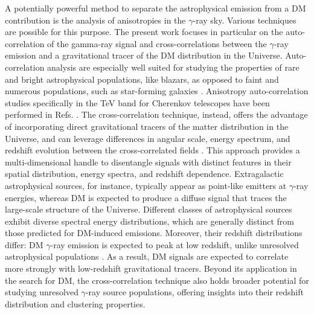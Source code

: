 A potentially powerful method to separate the astrophysical emission from a DM contribution is the analysis of anisotropies in the $\gamma$-ray sky.
Various techniques are possible for this purpose. 
The present work focuses in particular on the auto-correlation of the gamma-ray signal and 
cross-correlations between the $\gamma$-ray emission and a gravitational tracer of the DM distribution in the Universe.
Auto-correlation analysis are especially well suited for studying the properties of rare and bright astrophysical populations, like blazars, as opposed to faint and numerous populations, such as star-forming galaxies \cite{Ando:2006mt,Ando:2013ff,Fermi-LAT:2018udj,fornasa2016angular,Korsmeier:2022cwp}.
Anisotropy auto-correlation studies specifically in the TeV band for Cherenkov telescopes have been performed in Refs. \cite{Hutten:2018wop,Hutten:2016jko,Ripken:2012db}.
The cross-correlation technique, instead, offers the advantage of incorporating direct gravitational tracers of the matter distribution in the Universe, and can leverage differences in angular scale, energy spectrum, and redshift evolution between the cross-correlated fields \cite{camera2013novel,camera2015tomographic,fornengo2014particle}. This approach provides a multi-dimensional handle to disentangle signals with distinct features in their spatial distribution, energy spectra, and redshift dependence. Extragalactic astrophysical sources, for instance, typically appear as point-like emitters at $\gamma$-ray energies, whereas DM is expected to produce a diffuse signal that traces the large-scale structure of the Universe. Different classes of astrophysical sources exhibit diverse spectral energy distributions, which are generally distinct from those predicted for DM-induced emissions. Moreover, their redshift distributions differ: DM $\gamma$-ray emission is expected to peak at low redshift, unlike unresolved astrophysical populations {\cite{camera2013novel,camera2015tomographic,fornengo2014particle}}. As a result, DM signals are expected to correlate more strongly with low-redshift gravitational tracers.
Beyond its application in the search for DM, the cross-correlation technique also holds broader potential for studying unresolved $\gamma$-ray source populations, offering insights into their redshift distribution and clustering properties.


